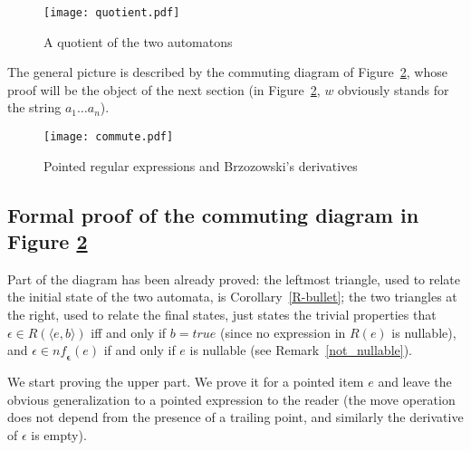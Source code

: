 \documentclass[preprint]{sigplanconf}
\newcommand{\nf}{\mathit{nf}_{\!\mathbf{\epsilon}}}
\newcounter{item}
\begin{document}
\begin{figure}[htp]
\begin{center}
\texttt{[image: quotient.pdf]}
\caption{A quotient of the two automatons\label{quotient}}
\end{center}
\end{figure}

The general picture is described by the commuting diagram
of Figure~\ref{commute}, whose proof will be the object of the 
next section (in Figure~\ref{commute}, $w$ obviously stands for
the string $a_1\dots a_n$).

\begin{figure}[htp]
\begin{center}
\texttt{[image: commute.pdf]}
\caption{Pointed regular expressions and Brzozowski's derivatives\label{commute}}
\end{center}
\end{figure}

\subsection{Formal proof of the commuting diagram in Figure \ref{commute}}

Part of the diagram has been already proved: the leftmost triangle, used to
relate the initial state of the two automata, is
Corollary~\ref{R-bullet}; the two triangles at the right, used to
relate the final states, just states the trivial properties that 
$\epsilon \in  R(\langle e,b\rangle)$ iff and only if $b=true$ (since
no expression in $R(e)$ is nullable), and
$\epsilon \in  \nf(e)$ if and only if $e$ is nullable (see
Remark~\ref{not_nullable}).

We start proving the upper part. We prove it for a pointed item $e$
and leave the obvious generalization to a pointed expression to the reader
(the move operation does not depend from the presence of a trailing
point, and similarly the derivative of $\epsilon$ is empty).
\end{document}
